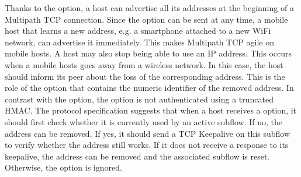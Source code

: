 \documentclass[letterpaper,10pt,english]{sphinxmanual}
\begin{document}
\sphinxAtStartPar
Thanks to the  option, a host can advertise all its addresses at the beginning of a Multipath TCP connection. Since the option can be sent at any time, a mobile host that learns a new address, e.g. a smartphone attached to a new Wi\sphinxhyphen{}Fi network, can advertise it immediately. This makes Multipath TCP agile on mobile hosts. A host may also stop being able to use an IP address. This occurs when a mobile hosts goes away from a wireless network. In this case, the host should inform its peer about the loss of the corresponding address. This is the role of the  option that contains the numeric identifier of the removed address. In contrast with the  option, the  option is not authenticated using a truncated HMAC. The protocol specification suggests that when a host receives a  option, it should first check whether it is currently used by an active subflow. If no, the address can be removed. If yes, it should send a TCP Keepalive on this subflow to verify whether the address still works. If it does not receive a response to its keepalive, the address can be removed and the associated subflow is reset. Otherwise, the  option is ignored.
\end{document}
